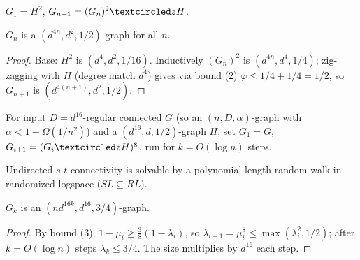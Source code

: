 \begin{construction}
  \label{constr:zigzag-family}
  $G_1=H^2$, $G_{n+1}=(G_n)^2\zigzag H$.
\end{construction}

\begin{proposition}
  \label{prop:zigzag-family}
  $G_n$ is a $(d^{4n},d^2,1/2)$-graph for all $n$.
\end{proposition}
\begin{proof}
  Base: $H^2$ is $(d^4,d^2,1/16)$. Inductively $(G_n)^2$ is
  $(d^{4n},d^4,1/4)$; zig-zagging with $H$ (degree match $d^4$) gives via bound
  (2) $\varphi\le1/4+1/4=1/2$, so $G_{n+1}$ is $(d^{4(n+1)},d^2,1/2)$.
\end{proof}

\begin{construction}[Reingold's graph sequence for $SL=L$]
  \label{constr:reingold-sl}
  For input $D=d^{16}$-regular connected $G$ (so an $(n,D,\alpha)$-graph with
  $\alpha<1-\Omega(1/n^2)$) and a $(d^{16},d,1/2)$-graph $H$, set $G_1=G$,
  $G_{i+1}=(G_i\zigzag H)^8$, run for $k=O(\log n)$ steps.
\end{construction}

\begin{theorem}
  \label{thm:akl}
  \notready
  Undirected $s$-$t$ connectivity is solvable by a polynomial-length random walk
  in randomized logspace ($SL\subseteq RL$).
\end{theorem}

\begin{claim}[9.4, Parameters of $G_k$]
  \label{claim:Gk-parameters}
  $G_k$ is an $(nd^{16k},d^{16},3/4)$-graph.
\end{claim}
\begin{proof}
  By bound (3), $1-\mu_i\ge\tfrac38(1-\lambda_i)$, so
  $\lambda_{i+1}=\mu_i^8\le\max(\lambda_i^2,1/2)$; after $k=O(\log n)$ steps
  $\lambda_k\le3/4$. The size multiplies by $d^{16}$ each step.
\end{proof}

